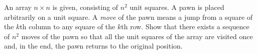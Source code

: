 An array $n \times n$ is given, consisting of $n^2$ unit squares. A pawn is placed arbitrarily on a unit square. A \textit{move} of the pawn means a jump from a square of the $k$th column to any square of the $k$th row. Show that there exists a sequence of $n^2$ moves of the pawn so that all the unit squares of the array are visited once and, in the end, the pawn returns to the original position.